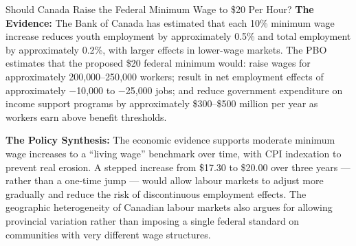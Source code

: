\begin{policydebate}{Should Canada Raise the Federal Minimum Wage to \$20 Per Hour?}
\textbf{The Evidence:}
The Bank of Canada has estimated that each 10\% minimum wage increase
reduces youth employment by approximately 0.5\% and total employment by
approximately 0.2\%, with larger effects in lower-wage markets. The PBO
estimates that the proposed \$20 federal minimum would: raise wages for
approximately 200{,}000--250{,}000 workers; result in net employment effects
of approximately $-$10{,}000 to $-$25{,}000 jobs; and reduce government
expenditure on income support programs by approximately \$300--\$500 million
per year as workers earn above benefit thresholds.

\textbf{The Policy Synthesis:} The economic evidence supports moderate
minimum wage increases to a ``living wage'' benchmark over time, with
CPI indexation to prevent real erosion. A stepped increase from \$17.30
to \$20.00 over three years --- rather than a one-time jump --- would
allow labour markets to adjust more gradually and reduce the risk of
discontinuous employment effects. The geographic heterogeneity of Canadian
labour markets also argues for allowing provincial variation rather than
imposing a single federal standard on communities with very different
wage structures.
\end{policydebate}

